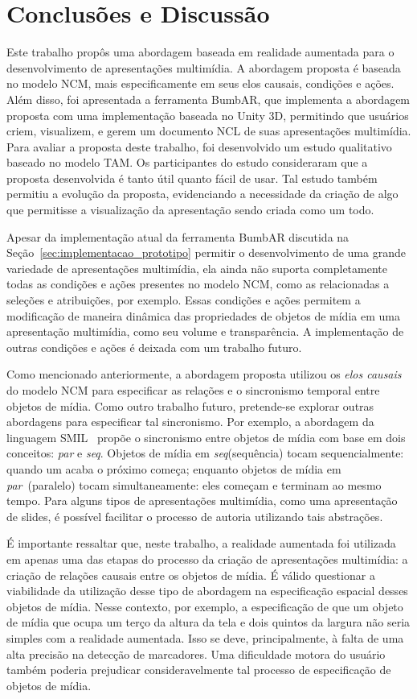 \documentclass[../main.tex]{subfiles}
\begin{document}
\chapter{Conclusões e Discussão}\label{cap:conclusoes}

Este trabalho propôs uma abordagem baseada em realidade aumentada para o desenvolvimento de apresentações multimídia. A abordagem proposta é baseada no modelo NCM, mais especificamente em seus elos causais, condições e ações. Além disso, foi apresentada a ferramenta BumbAR, que implementa a abordagem proposta com uma implementação baseada no Unity 3D, permitindo que usuários criem, visualizem, e gerem um documento NCL de suas apresentações multimídia. Para avaliar a proposta deste trabalho, foi desenvolvido um estudo qualitativo baseado no modelo TAM. Os participantes do estudo consideraram que a proposta desenvolvida é tanto útil quanto fácil de usar. Tal estudo também permitiu a evolução da proposta, evidenciando a necessidade da criação de algo que permitisse a visualização da apresentação sendo criada como um todo.

Apesar da implementação atual da ferramenta BumbAR discutida na Seção~\ref{sec:implementacao_prototipo} permitir o desenvolvimento de uma grande variedade de apresentações multimídia, ela ainda não suporta completamente todas as condições e ações presentes no modelo NCM, como as relacionadas a seleções e atribuições, por exemplo. Essas condições e ações permitem a modificação de maneira dinâmica das propriedades de objetos de mídia em uma apresentação multimídia, como seu volume e transparência. A implementação de outras condições e ações é deixada com um trabalho futuro.

Como mencionado anteriormente, a abordagem proposta utilizou os \emph{elos causais} do modelo NCM para especificar as relações e o sincronismo temporal entre objetos de mídia. Como outro trabalho futuro, pretende-se explorar outras abordagens para especificar tal sincronismo. Por exemplo, a abordagem da linguagem SMIL~\cite{rutledge2001smil} propõe o sincronismo entre objetos de mídia com base em dois conceitos: \emph{par} e \emph{seq}. Objetos de mídia em \emph{seq}(sequência) tocam sequencialmente: quando um acaba o próximo começa; enquanto objetos de mídia em \emph{par}~(paralelo) tocam simultaneamente: eles começam e terminam ao mesmo tempo. Para alguns tipos de apresentações multimídia, como uma apresentação de slides, é possível facilitar o processo de autoria utilizando tais abstrações.

É importante ressaltar que, neste trabalho, a realidade aumentada foi utilizada em apenas uma das etapas do processo da criação de apresentações multimídia: a criação de relações causais entre os objetos de mídia. É válido questionar a viabilidade da utilização desse tipo de abordagem na especificação espacial desses objetos de mídia. Nesse contexto, por exemplo, a especificação de que um objeto de mídia que ocupa um terço da altura da tela e dois quintos da largura não seria simples com a realidade aumentada. Isso se deve, principalmente, à falta de uma alta precisão na detecção de marcadores. Uma dificuldade motora do usuário também poderia prejudicar consideravelmente tal processo de especificação de objetos de mídia. 
\end{document}
